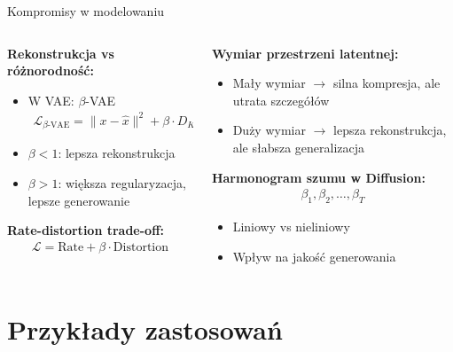 \documentclass{beamer}
\begin{document}
\begin{frame}{Kompromisy w modelowaniu}
  \begin{columns}
    \begin{column}{0.5\textwidth}
    \textbf{Rekonstrukcja vs różnorodność:}
    \begin{itemize}
    \item W VAE: $\beta$-VAE
    \begin{align*}
    \mathcal{L}_{\beta\text{-VAE}} = \|x - \hat{x}\|^2 + \beta \cdot D_{KL}
    \end{align*}
    \item $\beta < 1$: lepsza rekonstrukcja
    \item $\beta > 1$: większa regularyzacja, lepsze generowanie
    \end{itemize}
    
    \textbf{Rate-distortion trade-off:}
    \begin{align*}
    \mathcal{L} = \text{Rate} + \beta \cdot \text{Distortion}
    \end{align*}
    \end{column}
    \begin{column}{0.5\textwidth}
    \textbf{Wymiar przestrzeni latentnej:}
    \begin{itemize}
    \item Mały wymiar $\rightarrow$ silna kompresja, ale utrata szczegółów
    \item Duży wymiar $\rightarrow$ lepsza rekonstrukcja, ale słabsza generalizacja
    \end{itemize}
    
    \textbf{Harmonogram szumu w Diffusion:}
    \begin{align*}
    \beta_1, \beta_2, \ldots, \beta_T
    \end{align*}
    \begin{itemize}
    \item Liniowy vs nieliniowy
    \item Wpływ na jakość generowania
    \end{itemize}
    \end{column}
  \end{columns}
\end{frame}

\section{Przykłady zastosowań}
\end{document}
